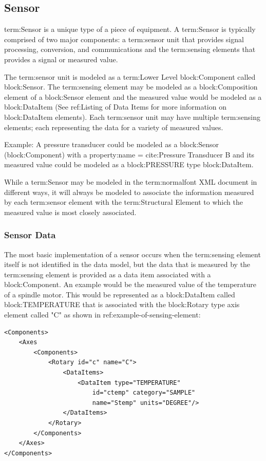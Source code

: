 \subsection{Sensor} \label{sec:Sensor}

{term:Sensor} is a unique type of a piece of equipment.  A {term:Sensor} is typically comprised of two major components: a {term:sensor unit} that provides signal processing, conversion, and communications and the {term:sensing elements} that provides a signal or measured value.

The {term:sensor unit} is modeled as a {term:Lower Level} {block:Component} called {block:Sensor}.  The {term:sensing element} may be modeled as a {block:Composition} element of a {block:Sensor} element and the measured value would be modeled as a {block:DataItem} (See {ref:Listing of Data Items} for more information on {block:DataItem} elements).  Each {term:sensor unit} may have multiple {term:sensing elements}; each representing the data for a variety of measured values.

Example:  A pressure transducer could be modeled as a {block:Sensor} ({block:Component}) with a {property:name} = {cite:Pressure Transducer B} and its measured value could be modeled as a {block:PRESSURE} type {block:DataItem}.

While a {term:Sensor} may be modeled in the {term:normalfont XML} document in different ways, it will always be modeled to associate the information measured by each {term:sensor element} with the {term:Structural Element} to which the measured value is most closely associated.   

\subsubsection{Sensor Data}

The most basic implementation of a sensor occurs when the {term:sensing element} itself is not identified in the data model, but the data that is measured by the {term:sensing element} is provided as a data item associated with a {block:Component}.  An example would be the measured value of the temperature of a spindle motor.  This would be represented as a {block:DataItem} called {block:TEMPERATURE} that is associated with the {block:Rotary} type axis element called "C" as shown in {ref:example-of-sensing-element}:

\newpage 

\begin{lstlisting}[firstnumber=1,escapechar=|,%
    caption={Example of Sensing Element provided as data item associated with a Component}, label={lst:example-of-sensing-element}]
<Components>
    <Axes
        <Components>
            <Rotary id="c" name="C">
                <DataItems>
                    <DataItem type="TEMPERATURE" 
                        id="ctemp" category="SAMPLE" 
                        name="Stemp" units="DEGREE"/>
                </DataItems>
            </Rotary>
        </Components>
    </Axes>
</Components>
\end{lstlisting}


